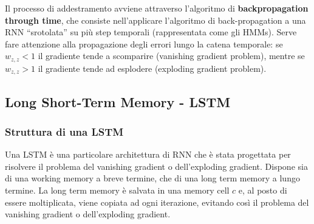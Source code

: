 Il processo di addestramento avviene attraverso l'algoritmo di \textbf{backpropagation through time}, che consiste nell'applicare
l'algoritmo di back-propagation a una RNN ``srotolata'' su più step temporali (rappresentata come gli HMMs). Serve fare attenzione
alla propagazione degli errori lungo la catena temporale: se \(w_{z,z} < 1\) il gradiente tende a scomparire (vanishing gradient
problem), mentre se \(w_{z,z} > 1\) il gradiente tende ad esplodere (exploding gradient problem).

\subsection{Long Short-Term Memory - LSTM}
\subsubsection*{Struttura di una LSTM}
Una LSTM è una particolare architettura di RNN che è stata progettata per risolvere il problema del vanishing gradient o
dell'exploding gradient. Dispone sia di una working memory a breve termine, che di una long term memory a lungo termine.
La long term memory è salvata in una memory cell \(c\) e, al posto di essere moltiplicata, viene copiata ad ogni iterazione,
evitando così il problema del vanishing gradient o dell'exploding gradient. 

